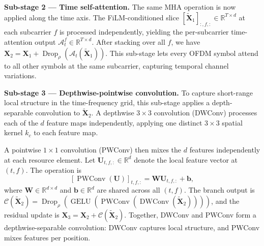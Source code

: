 \documentclass[conference,letterpaper]{IEEEtran}
\begin{document}
	\textbf{Sub-stage 2 --- Time self-attention.}
	The same MHA operation is now applied along the time axis.
	The FiLM-conditioned slice $[\widetilde{\mathbf{X}}_1]_{:,f,:}\in\mathbb{R}^{T\times d}$ at each subcarrier $f$ is processed independently, yielding the per-subcarrier time-attention output $\mathcal{A}_{t}^{f}\in\mathbb{R}^{T\times d}$.
	After stacking over all $f$, we have 		$\mathbf{X}_2 = \mathbf{X}_1 + \operatorname{Drop}_\rho(\mathcal{A}_{t}(\widetilde{\mathbf{X}}_1))$.
	This sub-stage lets every OFDM symbol attend to all other symbols at the same subcarrier, capturing temporal channel variations.
	
	\textbf{Sub-stage 3 --- Depthwise-pointwise convolution.}
	To capture short-range local structure in the time-frequency grid, this sub-stage applies a depth-separable convolution to $\widetilde{\mathbf{X}}_2$.
	A depthwise $3\times3$ convolution (DWConv) processes each of the $d$ feature maps independently, applying one distinct $3\times3$ spatial kernel $k_c$ to each feature map.
	
	A pointwise $1\times1$ convolution (PWConv) then mixes the $d$ features independently at each resource element. Let $\mathbf{U}_{t,f,:}\in\mathbb{R}^{d}$ denote the local feature vector at $(t,f)$. The operation is
	\begin{equation}
		\label{eq:pwconv}
		[\operatorname{PWConv}(\mathbf{U})]_{t,f,:}
		=
		\mathbf{W}\mathbf{U}_{t,f,:}+\mathbf{b},
	\end{equation}
	where $\mathbf{W}\in\mathbb{R}^{d\times d}$ and $\mathbf{b}\in\mathbb{R}^d$ are shared across all $(t,f)$.
	The branch output is $\mathcal{C}(\widetilde{\mathbf{X}}_2)=\operatorname{Drop}_\rho(\operatorname{GELU}(\operatorname{PWConv}(\operatorname{DWConv}(\widetilde{\mathbf{X}}_2))))$, and the residual update is $\mathbf{X}_3 = \mathbf{X}_2 + \mathcal{C}(\widetilde{\mathbf{X}}_2)$.
	Together, DWConv and PWConv form a depthwise-separable convolution: DWConv captures local structure, and PWConv mixes features per position.
	
\end{document}
